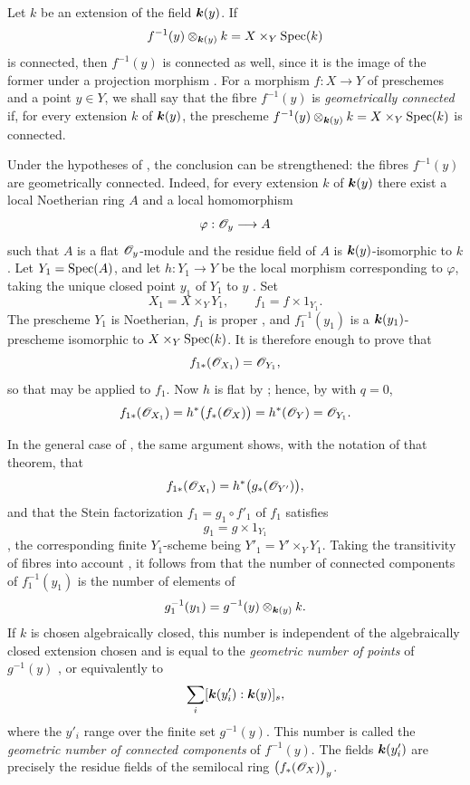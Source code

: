 \begin{remark}[4.3.4]
\label{III.4.3.4}
Let $k$ be an extension of the field $\boldsymbol{k}(y)$.  If
\[
  f^{-1}(y)\otimes_{\boldsymbol{k}(y)}k
  =
  X\times_Y\operatorname{Spec}(k)
\]
is connected, then $f^{-1}(y)$ is connected as well, since it is the
image of the former under a projection morphism
.  For a morphism $f:X\to Y$ of preschemes and a
point $y\in Y$, we shall say that the fibre $f^{-1}(y)$ is
\emph{geometrically connected} if, for every extension $k$ of
$\boldsymbol{k}(y)$, the prescheme
$f^{-1}(y)\otimes_{\boldsymbol{k}(y)}k=X\times_Y\operatorname{Spec}(k)$ is connected.


Under the hypotheses of , the conclusion can be
strengthened: the fibres $f^{-1}(y)$ are geometrically connected.
Indeed, for every extension $k$ of $\boldsymbol{k}(y)$ there exist a local
Noetherian ring $A$ and a local homomorphism
\[
  \varphi:\mathscr{O}_y\longrightarrow A
\]
such that $A$ is a flat $\mathscr{O}_y$-module and the residue field of
$A$ is $\boldsymbol{k}(y)$-isomorphic to $k$ .
Let $Y_1=\operatorname{Spec}(A)$, and let $h:Y_1\to Y$ be the local morphism
corresponding to $\varphi$, taking the unique closed point $y_1$ of
$Y_1$ to $y$ .  Set
\[
  X_1=X\times_Y Y_1,
  \qquad
  f_1=f\times 1_{Y_1}.
\]
The prescheme $Y_1$ is Noetherian, $f_1$ is proper
, and $f_1^{-1}(y_1)$ is a
$\boldsymbol{k}(y_1)$-prescheme isomorphic to $X\times_Y\operatorname{Spec}(k)$.  It is
therefore enough to prove that
\[
  f_{1*}(\mathscr{O}_{X_1})=\mathscr{O}_{Y_1},
\]
so that  may be applied to $f_1$.  Now $h$ is flat
by ; hence, by  with $q=0$,
\[
  f_{1*}(\mathscr{O}_{X_1})
  =
  h^*\bigl(f_*(\mathscr{O}_X)\bigr)
  =
  h^*(\mathscr{O}_Y)
  =
  \mathscr{O}_{Y_1}.
\]

In the general case of , the same argument shows,
with the notation of that theorem, that
\[
  f_{1*}(\mathscr{O}_{X_1})
  =
  h^*\bigl(g_*(\mathscr{O}_{Y'})\bigr),
\]
and that the Stein factorization $f_1=g_1\circ f'_1$ of $f_1$
satisfies
\[
  g_1=g\times 1_{Y_1}
\]
, the corresponding finite $Y_1$-scheme being
$Y'_1=Y'\times_Y Y_1$.  Taking the transitivity of fibres into
account , it follows from
 that the number of connected components of
$f_1^{-1}(y_1)$ is the number of elements of
\[
  g_1^{-1}(y_1)
  =
  g^{-1}(y)\otimes_{\boldsymbol{k}(y)}k.
\]
If $k$ is chosen algebraically closed, this number is independent of
the algebraically closed extension chosen and is equal to the
\emph{geometric number of points} of $g^{-1}(y)$
, or equivalently to
\[
  \sum_i[\boldsymbol{k}(y'_i):\boldsymbol{k}(y)]_s,
\]
where the $y'_i$ range over the finite set $g^{-1}(y)$.  This number
is called the \emph{geometric number of connected components} of
$f^{-1}(y)$.  The fields $\boldsymbol{k}(y'_i)$ are precisely the residue
fields of the semilocal ring $\bigl(f_*(\mathscr{O}_X)\bigr)_y$.
\end{remark}

